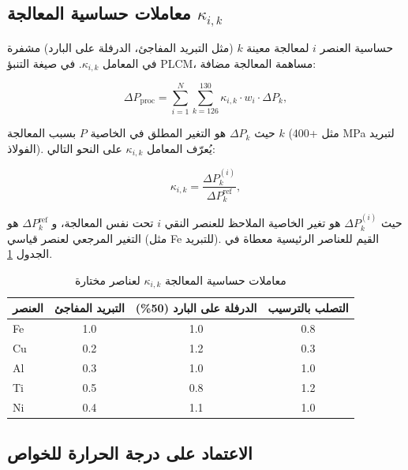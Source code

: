 \documentclass[11pt,a4paper]{article}
\begin{document}
\begin{otherlanguage}{arabic}
		\subsection{معاملات حساسية المعالجة \(\kappa_{i,k}\)}
		\label{subsec:processing-coefficients}
		
		حساسية العنصر \(i\) لمعالجة معينة \(k\) (مثل التبريد المفاجئ، الدرفلة على البارد) مشفرة في المعامل \(\kappa_{i,k}\). في صيغة التنبؤ PLCM، مساهمة المعالجة مضافة:
		
		\begin{equation}
			\Delta P_{\text{proc}} = \sum_{i=1}^{N} \sum_{k=126}^{130} \kappa_{i,k} \cdot w_i \cdot \Delta P_k,
			\label{eq:proc-contribution}
		\end{equation}
		
		حيث \(\Delta P_k\) هو التغير المطلق في الخاصية \(P\) بسبب المعالجة \(k\) (مثل +400 MPa لتبريد الفولاذ). يُعرّف المعامل \(\kappa_{i,k}\) على النحو التالي:
		
		\begin{equation}
			\kappa_{i,k} = \frac{\Delta P_k^{(i)}}{\Delta P_k^{\text{ref}}},
			\label{eq:kappa-proc-def}
		\end{equation}
		
		حيث \(\Delta P_k^{(i)}\) هو تغير الخاصية الملاحظ للعنصر النقي \(i\) تحت نفس المعالجة، و \(\Delta P_k^{\text{ref}}\) هو التغير المرجعي لعنصر قياسي (مثل Fe للتبريد). القيم للعناصر الرئيسية معطاة في الجدول \ref{tab:kappa-proc}.
		
		\begin{table}[htbp]
			\centering
			\caption{معاملات حساسية المعالجة \(\kappa_{i,k}\) لعناصر مختارة}
			\label{tab:kappa-proc}
			\begin{tabular}{lccc}
				\toprule
				العنصر & التبريد المفاجئ & الدرفلة على البارد (50\%) & التصلب بالترسيب \\
				\midrule
				Fe & 1.0 & 1.0 & 0.8 \\
				Cu & 0.2 & 1.2 & 0.3 \\
				Al & 0.3 & 1.0 & 1.0 \\
				Ti & 0.5 & 0.8 & 1.2 \\
				Ni & 0.4 & 1.1 & 1.0 \\
				\bottomrule
			\end{tabular}
		\end{table}
		
		\subsection{الاعتماد على درجة الحرارة للخواص}
		\label{subsec:temperature-dependence}
		

\end{otherlanguage}
\end{document}
